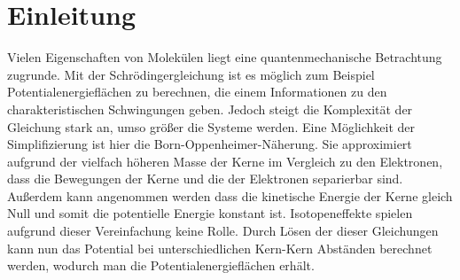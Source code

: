 \documentclass[a4paper]{scrartcl}
\begin{document}
\section{Einleitung}

Vielen Eigenschaften von Molekülen liegt eine quantenmechanische Betrachtung zugrunde. Mit der Schrödingergleichung ist es möglich zum Beispiel Potentialenergieflächen zu berechnen, die einem Informationen zu den charakteristischen Schwingungen  geben. Jedoch steigt die Komplexität der Gleichung stark an, umso größer die Systeme werden. Eine Möglichkeit der Simplifizierung ist hier die Born-Oppenheimer-Näherung. Sie approximiert aufgrund der vielfach höheren Masse der Kerne im Vergleich zu den Elektronen, dass die Bewegungen der Kerne und die der Elektronen separierbar sind. Außerdem kann angenommen werden dass die kinetische Energie der Kerne gleich Null und somit die potentielle Energie konstant ist. Isotopeneffekte spielen aufgrund dieser Vereinfachung keine Rolle.
Durch Lösen der dieser Gleichungen kann nun das Potential bei unterschiedlichen Kern-Kern Abständen berechnet werden, wodurch man die Potentialenergieflächen erhält.
\end{document}
